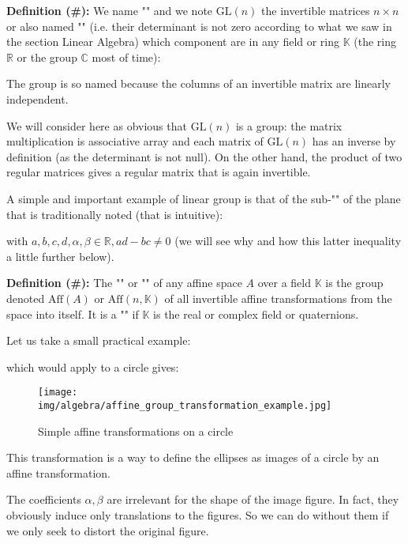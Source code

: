 	\textbf{Definition (\#\mydef):} We name "" and we note $\text{GL}(n)$ the invertible matrices $n\times n$ or also named "" (i.e. their determinant is not zero according to what we saw in the section Linear Algebra) which component are in any field or ring $\mathbb{K}$ (the ring $\mathbb{R}$ or the group $\mathbb{C}$ most of time):
	
	The group is so named because the columns of an invertible matrix are linearly independent.
	
	We will consider here as obvious that $\text{GL}(n)$ is a group: the matrix multiplication is associative array and each matrix of $\text{GL} (n)$ has an inverse by definition (as the determinant is not null). On the other hand, the product of two regular matrices gives a regular matrix that is again invertible.
	
	A simple and important example of linear group is that of the sub-"" of the plane that is traditionally noted (that is intuitive):
	
	with $a,b,c,d,\alpha,\beta\in \mathbb{R},ad-bc\neq 0$ (we will see why and how this latter inequality a little further below).
	
	\textbf{Definition (\#\mydef):} The "" or "" of any affine space $A$ over a field $\mathbb{K}$ is the group denoted $\text{Aff}(A)$ or $\text{Aff}(n,\mathbb{K})$ of all invertible affine transformations from the space into itself. It is a "" if $\mathbb{K}$ is the real or complex field or quaternions.
	
	Let us take a small practical example:
	
	which would apply to a circle gives:
	\begin{figure}[H]
			\centering
			\texttt{[image: img/algebra/affine\_group\_transformation\_example.jpg]}
			\caption{Simple affine transformations on a circle}
		\end{figure}
	This transformation is a way to define the ellipses as images of a circle by an affine transformation.
	
	The coefficients $\alpha,\beta$ are irrelevant for the shape of the image figure. In fact, they obviously induce only translations to the figures. So we can do without them if we only seek to distort the original figure.
	

